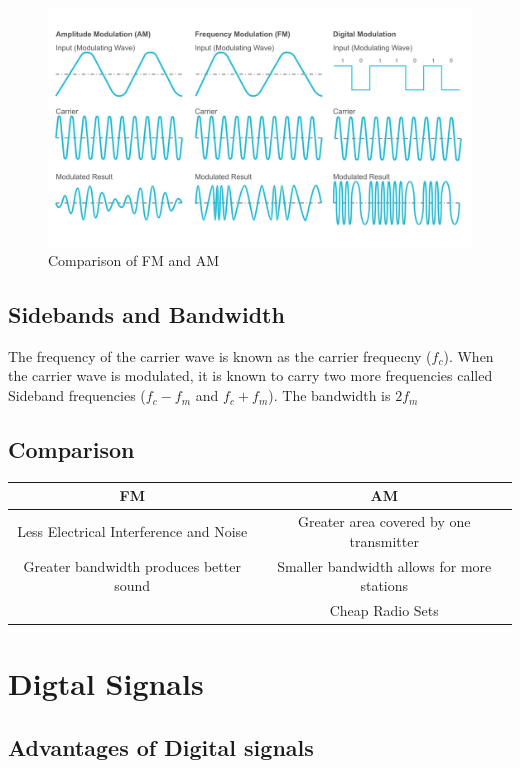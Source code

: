 \documentclass{scrbook}
\begin{document}
	\begin{figure}[t]
		\caption{Comparison of FM and AM \cite{taitra}}
		\label{fmamcomp}
		\includegraphics[width=\linewidth]{assets/fmam.png}
	\end{figure}

\subsection{Sidebands and Bandwidth}

	The frequency of the carrier wave is known as the carrier frequecny ($f_c$). When the carrier wave is modulated, it is known to carry two more frequencies called Sideband frequencies ($f_c - f_m$ and $f_c + f_m$). The bandwidth is $2f_m$

\subsection{Comparison}

	\begin{tabular}{| c | c |}
		\hline
		FM & AM \\
		\hline 
		Less Electrical Interference and Noise & Greater area covered by one transmitter \\ 
		Greater bandwidth produces better sound & Smaller bandwidth allows for more stations \\ 
		& Cheap Radio Sets \\
		\hline
	\end{tabular}

\section{Digtal Signals}

\subsection{Advantages of Digital signals}
\end{document}
